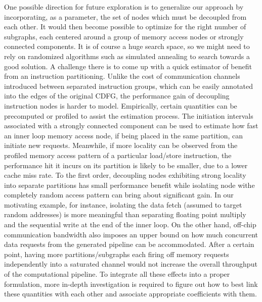 One possible direction for future exploration is to generalize our approach by incorporating, as a parameter, the set
of nodes which must be decoupled from each other. It would then become possible to optimize for the right number of subgraphs, each centered around a group of memory access nodes or strongly connected components. It is of course a huge search space, so we might
need to rely on randomized algorithms such as simulated annealing to search towards
a good solution. A challenge there is to come up with a quick estimator of benefit from an instruction partitioning. Unlike the cost of communication channels introduced between separated instruction groups, which can be easily annotated into the edges of the original CDFG, the performance gain of decoupling instruction nodes is harder to model. Empirically, certain quantities can be precomputed or profiled to assist the estimation process. The initiation intervals associated with a strongly connected component can be used to estimate how fast an inner loop memory access node, if being placed in the same partition, can initiate new requests. Meanwhile, if more locality can be observed from the profiled memory access pattern of a particular load/store instruction, the performance hit it incurs on its partition is likely to be smaller, due to a lower cache miss rate.
To the first order, decoupling nodes exhibiting strong locality into separate partitions has small performance benefit while isolating node withe completely random access pattern can bring about significant gain. In our
motivating example, for instance, isolating the data fetch (assumed to target random addresses) is more meaningful than separating floating point multiply and the sequential write at the end of the inner loop. On the other hand, 
off-chip communication bandwidth also imposes an upper bound on how much concurrent data
requests from the generated pipeline can be accommodated. After a certain point, having more partitions/subgraphs each firing off memory requests independently into a saturated channel would not increase the overall throughput of the computational pipeline. 
To integrate all these effects into a proper formulation, more in-depth investigation is required to figure out how to best link these quantities with each other and associate appropriate coefficients with them.




